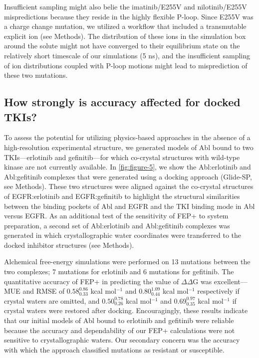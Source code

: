 \documentclass[phd,tocprelim]{cornell}
\renewcommand{\FIG}[1]{\autoref{fig:#1}}
\begin{document}
Insufficient sampling might also belie the imatinib/E255V and nilotinib/E255V mispredictions because they reside in the highly flexible P-loop.
Since E255V was a charge change mutation, we utilized a workflow that included a transmutable explicit ion (see Methods).
The distribution of these ions in the simulation box around the solute might not have converged to their equilibrium state on the relatively short timescale of our simulations (5 ns), and the insufficient sampling of ion distributions coupled with P-loop motions might lead to misprediction of these two mutations.

\subsection{How strongly is accuracy affected for docked TKIs?}
To assess the potential for utilizing physics-based approaches in the absence of a high-resolution experimental structure, we generated models of Abl bound to two TKIs---erlotinib and gefinitib---for which co-crystal structures with wild-type kinase are not currently available.
In \FIG{figure-5}, we show the Abl:erlotinib and Abl:gefitinib complexes that were generated using a docking approach (Glide-SP, see Methods). 
These two structures were aligned against the co-crystal structures of EGFR:erlotinib and EGFR:gefinitib to highlight the structural similarities between the binding pockets of Abl and EGFR and the TKI binding mode in Abl versus EGFR.
As an additional test of the sensitivity of FEP+ to system preparation, a second set of Abl:erlotinib and Abl:gefitinib complexes was generated in which crystallographic water coordinates were transferred to the docked inhibitor structures (see Methods).

Alchemical free-energy simulations were performed on 13 mutations between the two complexes; 7 mutations for erlotinib and 6 mutations for gefitinib.
The quantitative accuracy of FEP+ in predicting the value of $\Delta \Delta$G was excellent---MUE and RMSE of $0.58^{0.86}_{0.33}$ kcal mol$^{-1}$ and $0.80^{1.09}_{0.44}$ kcal mol$^{-1}$ respectively if crystal waters are omitted, and $0.50^{0.78}_{0.26}$ kcal mol$^{-1}$ and $0.69^{0.97}_{0.35}$ kcal mol$^{-1}$ if crystal waters were restored after docking.
Encouragingly, these results indicate that our initial models of Abl bound to erlotinib and gefitinib were reliable because the accuracy and dependability of our FEP+ calculations were not sensitive to crystallographic waters.
Our secondary concern was the accuracy with which the approach classified mutations as resistant or susceptible.
\end{document}
